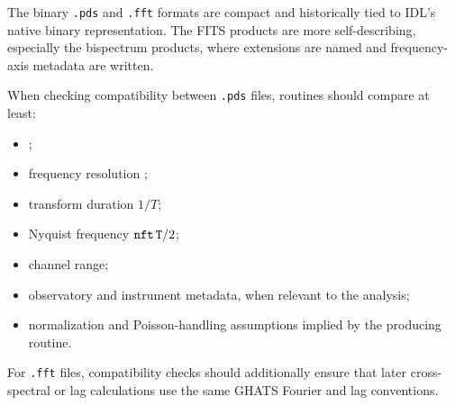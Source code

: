 The binary \texttt{.pds} and \texttt{.fft} formats are compact and historically
tied to IDL's native binary representation.  The FITS products are more
self-describing, especially the bispectrum products, where extensions are named
and frequency-axis metadata are written.

When checking compatibility between \texttt{.pds} files, routines should compare
at least:

\begin{itemize}
\item {};
\item frequency resolution ;
\item transform duration \(1/T\);
\item Nyquist frequency \(\param{nft}\,\param{T}/2\);
\item channel range;
\item observatory and instrument metadata, when relevant to the analysis;
\item normalization and Poisson-handling assumptions implied by the producing
      routine.
\end{itemize}

For \texttt{.fft} files, compatibility checks should additionally ensure that
later cross-spectral or lag calculations use the same GHATS Fourier and lag
conventions.
